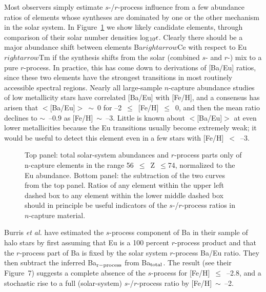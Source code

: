 \documentclass{ws-p8-50x6-00}
\begin{document}
Most observers simply estimate $s$-/$r$-process influence from a few 
abundance ratios of elements whose syntheses are dominated by one or the 
other mechanism in the solar system.  
In Figure~\ref{rs2} we show likely candidate elements, through 
comparison of their solar number densities log$_{\rm 10}\epsilon$. 
Clearly there should be a major abundance shift between elements
Ba$rightarrow$Ce with respect to Eu$rightarrow$Tm if the 
synthesis shifts
from the solar (combined $s$- and $r$-) mix to a pure $r$-process.  
In practice, this has come down to derivations of [Ba/Eu] ratios, since 
these two elements have the strongest transitions in most routinely 
accessible spectral regions.  
Nearly all large-sample $n$-capture abundance studies of low metallicity 
stars have correlated [Ba/Eu] with [Fe/H], and a consensus has arisen 
that $<$[Ba/Eu]$>$~$\sim$~0 for --2~$\leq$~[\rm{Fe/H}]~$\leq$~0, 
and then the mean ratio declines to $\sim$~--0.9 as [Fe/H]~$\sim$~--3.  
Little is known about $<$[Ba/Eu]$>$ at even lower metallicities because
the Eu transitions usually become extremely weak; it would be useful to 
detect this element even in a few stars with [Fe/H]~$<$~--3.
 
\begin{figure}[t]
\epsfxsize=20pc \hspace*{0.5in}
 \caption{Top panel: total solar-system abundances and $r$-process
parts only of n-capture elements in the range 56~$\leq$~Z~$\leq$74, 
normalized to the Eu abundance.
Bottom panel: the subtraction of the two curves from the top panel.
Ratios of any element within the upper left dashed box to any element
within the lower middle dashed box should in principle be useful
indicators of the $s$-/$r$-process ratios in $n$-capture material.
\label{rs2}}
\end{figure}

Burris {\it et al.}\cite{Bu00} have estimated the $s$-process component of
Ba in their sample of halo stars by first assuming that Eu is a 100 percent  
$r$-process product and that the $r$-process part of Ba is fixed by the 
solar system $r$-process Ba/Eu ratio.
They then subtract the inferred Ba$_{\rm r-process}$ from Ba$_{\rm total}$.
The result (see their Figure~7) suggests a complete absence of the 
$s$-process for [Fe/H]~$\leq$~--2.8, and a stochastic rise to a full 
(solar-system) $s$-/$r$-process ratio by [Fe/H]~$\sim$~--2.
\end{document}
